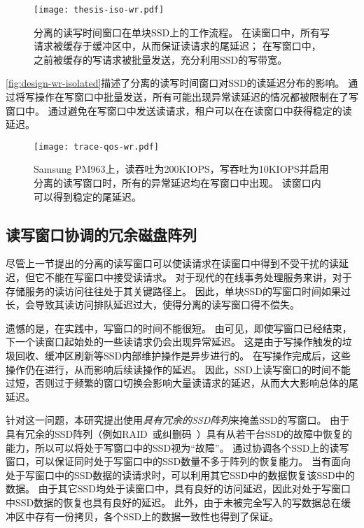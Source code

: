 \begin{figure}[h]
  \centering
  \texttt{[image: thesis-iso-wr.pdf]}
  \caption{
        分离的读写时间窗口在单块SSD上的工作流程。
        在读窗口中，所有写请求被缓存于缓冲区中，从而保证读请求的尾延迟；
        在写窗口中，之前被缓存的写请求被批量发送，充分利用SSD的写带宽。
      }
  \label{fig:design-iso-wr}
\end{figure}

\autoref{fig:design-wr-isolated}描述了分离的读写时间窗口对SSD的读延迟分布的影响。
通过将写操作在写窗口中批量发送，所有可能出现异常读延迟的情况都被限制在了写窗口中。
通过避免在写窗口中发送读请求，租户可以在在读窗口中获得稳定的读延迟。

\begin{figure}[h]
  \centering
  \texttt{[image: trace-qos-wr.pdf]}
  \caption{
        Samsung PM963上，读吞吐为200KIOPS，写吞吐为10KIOPS并启用分离的读写窗口时，所有的异常延迟均在写窗口中出现。
        读窗口内可以得到稳定的尾延迟。
      }
  \label{fig:design-wr-isolated}
\end{figure}

\subsection{读写窗口协调的冗余磁盘阵列}
\label{sec:design-array-composition}

尽管上一节提出的分离的读写窗口可以使读请求在读窗口中得到不受干扰的读延迟，但它不能在写窗口中接受读请求。
对于现代的在线事务处理服务来讲，对于存储服务的读访问往往处于其关键路径上。
因此，单块SSD的写窗口时间如果过长，会导致其读访问排队延迟过大，使得分离的读写窗口得不偿失。

遗憾的是，在实践中，写窗口的时间不能很短。
由可见，即使写窗口已经结束，下一个读窗口起始处的一些读请求仍会出现异常延迟。
这是由于写操作触发的垃圾回收、缓冲区刷新等SSD内部维护操作是异步进行的。
在写操作完成后，这些操作仍在进行，从而影响后续读操作的延迟。
因此，SSD上读写窗口的时间不能过短，否则过于频繁的窗口切换会影响大量读请求的延迟，从而大大影响总体的尾延迟。

针对这一问题，本研究提出使用\textit{具有冗余的SSD阵列}来掩盖SSD的写窗口。
由于具有冗余的SSD阵列（例如RAID~\cite{patterson1988case}或纠删码~\cite{huang2012erasure}）具有从若干台SSD的故障中恢复的能力，所以可以将处于写窗口中的SSD视为“故障”。
通过协调各个SSD上的读写窗口，可以保证同时处于写窗口中的SSD数量不多于阵列的恢复能力。
当有面向处于写窗口中的SSD数据的读请求时，可以利用其它SSD中的数据恢复该SSD中的数据。
由于其它SSD均处于读窗口中，具有良好的访问延迟，因此对处于写窗口中SSD数据的恢复也具有良好的延迟。
此外，由于未被完全写入的写数据总在缓冲区中存有一份拷贝，各个SSD上的数据一致性也得到了保证。

